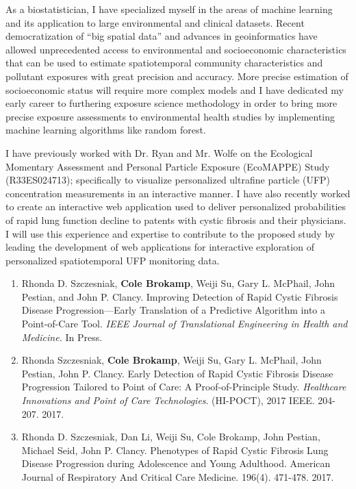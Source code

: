 \documentclass{nihbiosketch}
\begin{document}
\begin{statement}

As a biostatistician, I have specialized myself in the areas of machine learning and its application to large environmental and clinical datasets.  Recent democratization of “big spatial data” and advances in geoinformatics have allowed unprecedented access to environmental and socioeconomic characteristics that can be used to estimate spatiotemporal community characteristics and pollutant exposures with great precision and accuracy. More precise estimation of socioeconomic status will require more complex models and I have dedicated my early career to furthering exposure science methodology in order to bring more precise exposure assessments to environmental health studies by implementing machine learning algorithms like random forest. 

I have previously worked with Dr. Ryan and Mr. Wolfe on the Ecological Momentary Assessment and Personal Particle Exposure (EcoMAPPE) Study (R33ES024713); specifically to visualize personalized ultrafine particle (UFP) concentration measurements in an interactive manner.  I have also recently worked to create an interactive web application used to deliver personalized probabilities of rapid lung function decline to patents with cystic fibrosis and their physicians.  I will use this experience and expertise to contribute to the proposed study by leading the development of web applications for interactive exploration of personalized spatiotemporal UFP monitoring data.\\

\begin{enumerate}

	\item Rhonda D. Szczesniak, \textbf{Cole Brokamp}, Weiji Su, Gary L. McPhail, John Pestian, and John P. Clancy. Improving Detection of Rapid Cystic Fibrosis Disease Progression—Early Translation of a Predictive Algorithm into a Point-of-Care Tool. \textit{IEEE Journal of Translational Engineering in Health and Medicine.} In Press.

	\item Rhonda Szczesniak, \textbf{Cole Brokamp}, Weiji Su, Gary L. McPhail, John Pestian, John P. Clancy. Early Detection of Rapid Cystic Fibrosis Disease Progression Tailored to Point of Care: A Proof-of-Principle Study. \textit{Healthcare Innovations and Point of Care Technologies}. (HI-POCT), 2017 IEEE. 204-207. 2017.
	
	\item Rhonda D. Szczesniak, Dan Li, Weiji Su, Cole Brokamp, John Pestian, Michael Seid, John P. Clancy. Phenotypes of Rapid Cystic Fibrosis Lung Disease Progression during Adolescence and Young Adulthood. American Journal of Respiratory And Critical Care Medicine. 196(4). 471-478. 2017.
	

\end{enumerate}
\end{statement}
\end{document}
